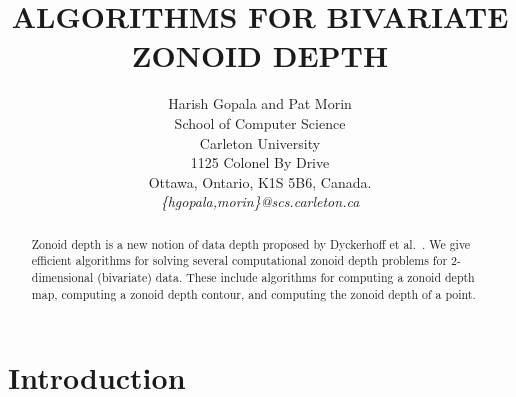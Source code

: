 \documentclass[charterfonts,lotsofwhite]{patmorin}
\begin{document}
\title{\MakeUppercase{Algorithms for bivariate zonoid depth}}
\author{Harish Gopala and Pat Morin\\ School of Computer Science\\ Carleton University\\ 1125 Colonel By Drive\\ Ottawa, Ontario, K1S 5B6, Canada.\\ \em {\{hgopala,morin\}@scs.carleton.ca}}
\date{}
\maketitle

\begin{abstract}
Zonoid depth is a new notion of data depth proposed by Dyckerhoff et al.\ \cite{zonoid_data_depth_theory_and_computation}. We give efficient algorithms for solving several computational zonoid depth problems for 2-dimensional (bivariate) data. These include algorithms for computing a zonoid depth map, computing a zonoid depth contour, and computing the zonoid depth of a point.
\end{abstract}

\section{Introduction}\label{section_introduction}
\end{document}
